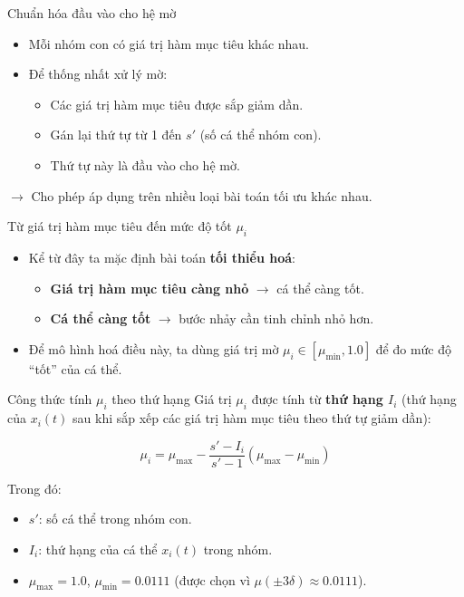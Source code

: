 \documentclass[10pt]{beamer}
\begin{document}
\begin{frame}{Chuẩn hóa đầu vào cho hệ mờ}
\begin{itemize}
    \item Mỗi nhóm con có giá trị hàm mục tiêu khác nhau.
    \item Để thống nhất xử lý mờ:
    \begin{itemize}
        \item Các giá trị hàm mục tiêu được sắp giảm dần.
        \item Gán lại thứ tự từ 1 đến $s'$ (số cá thể nhóm con).
        \item Thứ tự này là đầu vào cho hệ mờ.
    \end{itemize}
\end{itemize}
$\to$ Cho phép áp dụng trên nhiều loại bài toán tối ưu khác nhau.
\end{frame}



\begin{frame}{Từ giá trị hàm mục tiêu đến mức độ tốt $\mu_i$}
\begin{itemize}
    \item Kể từ đây ta mặc định bài toán \textbf{tối thiểu hoá}:
    \begin{itemize}
        \item \textbf{Giá trị hàm mục tiêu càng nhỏ} $\to$ cá thể càng tốt.
        \item \textbf{Cá thể càng tốt} $\to$ bước nhảy cần tinh chỉnh nhỏ hơn.
    \end{itemize}
    \item Để mô hình hoá điều này, ta dùng giá trị mờ $\mu_i \in [\mu_{\min}, 1.0]$ để đo mức độ “tốt” của cá thể.
\end{itemize}
\end{frame}

\begin{frame}{Công thức tính $\mu_i$ theo thứ hạng}
Giá trị $\mu_i$ được tính từ \textbf{thứ hạng $I_i$} (thứ hạng của $x_i(t)$ sau khi sắp xếp các giá trị hàm mục tiêu theo thứ
tự giảm dần):

\[
\mu_i = \mu_{\max} - \frac{s' - I_i}{s' - 1}(\mu_{\max} - \mu_{\min})
\]

\vspace{1em}
Trong đó:
\begin{itemize}
    \item $s'$: số cá thể trong nhóm con.
    \item $I_i$: thứ hạng của cá thể $x_i(t)$ trong nhóm.
    \item $\mu_{\max} = 1.0$, $\mu_{\min} = 0.0111$ (được chọn vì $\mu(\pm3\delta) \approx 0.0111$).
\end{itemize}
\end{frame}
\end{document}
